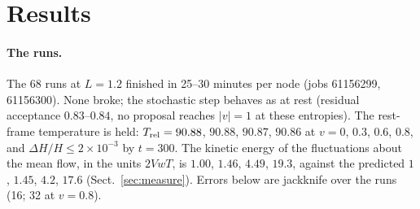 \documentclass[11pt,aps,preprint,nofootinbib,superscriptaddress,tightenlines]{revtex4-2}
\def\Sect#1{Sect.~\ref{#1}}
\let\oldparagraph\paragraph
\renewcommand{\paragraph}{\par\bigskip\oldparagraph}
\begin{document}
\section{Results}
\label{sec:results}

\paragraph{The runs.}  The 68 runs at $L=1.2$ finished in 25--30 minutes per node (jobs 61156299,
61156300).  None broke; the stochastic step behaves as at rest (residual acceptance $0.83$--$0.84$, no
proposal reaches $|v|=1$ at these entropies).  The rest-frame temperature is held: $T_{\rm rel}=90.88$,
$90.88$, $90.87$, $90.86$ at $v=0$, $0.3$, $0.6$, $0.8$, and $\Delta H/H\le2\times10^{-3}$ by $t=300$.  The kinetic energy
of the fluctuations about the mean flow, in the units $2VwT$, is $1.00$, $1.46$, $4.49$, $19.3$, against the
predicted $1$, $1.45$, $4.2$, $17.6$ (\Sect{sec:measure}).  Errors below are jackknife over the runs (16;
32 at $v=0.8$).
\end{document}
